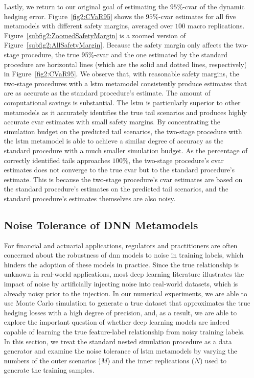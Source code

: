 Lastly, we return to our original goal of estimating the $95\%$-\gls{cvar} of the dynamic hedging error.
Figure~\ref{fig2:CVaR95} shows the $95\%$-\gls{cvar} estimates for all five metamodels with different safety margins, averaged over $100$ macro replications.
Figure~\ref{subfig2:ZoomedSafetyMargin} is a zoomed version of Figure~\ref{subfig2:AllSafetyMargin}.
Because the safety margin only affects the two-stage procedure, the true 95\%-\gls{cvar} and the one estimated by the standard procedure are horizontal lines (which are the solid and dotted lines, respectively) in Figure~\ref{fig2:CVaR95}. 
We observe that, with reasonable safety margins, the two-stage procedures with a \gls{lstm} metamodel consistently produce estimates that are as accurate as the standard procedure's estimate.
The amount of computational savings is substantial.
The \gls{lstm} is particularly superior to other metamodels as it accurately identifies the true tail scenarios and produces highly accurate \gls{cvar} estimates with small safety margins.
By concentrating the simulation budget on the predicted tail scenarios, the two-stage procedure with the \gls{lstm} metamodel is able to achieve a similar degree of accuracy as the standard procedure with a much smaller simulation budget.
As the percentage of correctly identified tails approaches $100\%$, the two-stage procedure's \gls{cvar} estimates does not converge to the true \gls{cvar} but to the standard procedure's estimate.
This is because the two-stage procedure's \gls{cvar} estimates are based on the standard procedure's estimates on the predicted tail scenarios, and the standard procedure's estimates themselves are also noisy.

\subsection{Noise Tolerance of DNN Metamodels} \label{subsec2:noiseTolerance}

For financial and actuarial applications, regulators and practitioners are often concerned about the robustness of \gls{dnn} models to noise in training labels, which hinders the adoption of these models in practice.
Since the true relationship is unknown in real-world applications, most deep learning literature illustrates the impact of noise by artificially injecting noise into real-world datasets, which is already noisy prior to the injection.
In our numerical experiments, we are able to use Monte Carlo simulation to generate a true dataset that approximates the true hedging losses with a high degree of precision, and, as a result, we are able to explore the important question of whether deep learning models are indeed capable of learning the true feature-label relationship from noisy training labels.
In this section, we treat the standard nested simulation procedure as a data generator and examine the noise tolerance of \gls{lstm} metamodels by varying the numbers of the outer scenarios ($M$) and the inner replications ($N$) used to generate the training samples.

